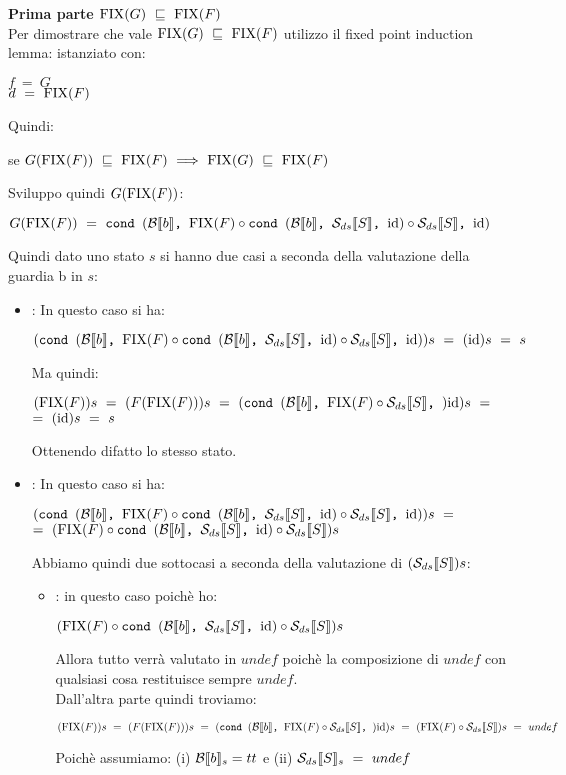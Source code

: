 {	\textbf{Prima parte $\fixp{G}~\mineq~\fixp{F}$}\\
	Per dimostrare che vale $\fixp{G}~\mineq~\fixp{F}$ utilizzo il
	fixed point induction lemma:
	\fil{}
	istanziato con:
	\begin{center}
	$f~=~G$ \\
	$d~=~\fixp{F}$
	\end{center}
	Quindi:
	\begin{center}
	se $G(\fixp{F})~\mineq~\fixp{F}~\Longrightarrow~\fixp{G}~\mineq~\fixp{F}$
	\end{center}
	Sviluppo quindi $G(\fixp{F})$:
	\begin{center}
	$G(\fixp{F})~=~\cond{b}{\fixp{F} \circ \cond{b}{\Sds{}}{\idDS} \circ{} 
	\Sds{}}{\idDS}$
	\end{center}
	Quindi dato uno stato $s$ si hanno due casi a seconda della valutazione
	della guardia b in $s$:
	\begin{itemize}
		\item {}: In questo caso si ha:
		\begin{center}
		$(\cond{b}{\fixp{F} \circ \cond{b}{\Sds{}}{\idDS} \circ{} \Sds{}}
		{\idDS})s~=~(\idDS{})s~=~s$
		\end{center}
		Ma quindi:
		\begin{center}
		$(\fixp{F})s~=~(F(\fixp{F}))s~=~(\cond{b}{\fixp{F} \circ{} \Sds{}}
		{\idDS})s~=$\\$=~(\idDS{})s~=~s$
		\end{center}
		Ottenendo difatto lo stesso stato.

		\item {}: In questo caso si ha:
		\begin{center}
		$(\cond{b}{\fixp{F} \circ \cond{b}{\Sds{}}{\idDS} \circ{} \Sds{}}
		{\idDS})s~=$\\$=~(\fixp{F} \circ \cond{b}{\Sds{}}{\idDS} \circ{} 
		\Sds{})s$
		\end{center}
		Abbiamo quindi due sottocasi a seconda della valutazione di $(\Sds{})s$:
		\begin{itemize}
			\item {}: in questo caso poichè ho:
			\begin{center}
			$(\fixp{F} \circ \cond{b}{\Sds{}}{\idDS} \circ{} \Sds{})s$
			\end{center}
			Allora tutto verrà valutato in $undef$ poichè la composizione di 
			$undef$ con qualsiasi cosa restituisce sempre $undef$.\\
			Dall'altra parte quindi troviamo:
			\begin{center}
			$(\fixp{F})s~=~(F(\fixp{F}))s~=~(\cond{b}{\fixp{F} \circ{} \Sds{}}
			{\idDS})s~=~(\fixp{F} \circ{} \Sds{})s~=~undef$
			\end{center}
			Poichè assumiamo: (i) $\evalBbs{b}{s}=tt$ e (ii) $\Sds{}_s~=~undef$


\end{itemize}
\end{itemize}}
